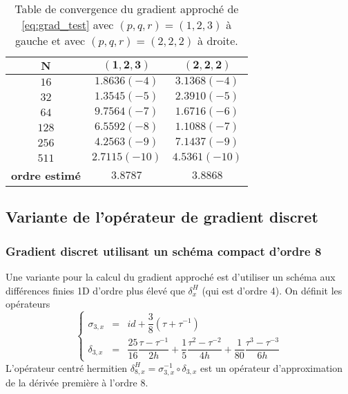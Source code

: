 \begin{table}[htbp]
\begin{center}
\begin{tabular}{|c||c|c|}
\hline
$\mathbf{N}$    & $\mathbf{(1,2,3)}$     & $\mathbf{(2,2,2)}$     \\
\hline
\hline
$16$   & $1.8636 (-4)$ & $3.1368 (-4)$ \\
$32$   & $1.3545 (-5)$ & $2.3910 (-5)$ \\
$64$   & $9.7564 (-7)$ & $1.6716 (-6)$ \\
$128$  & $6.5592 (-8)$ & $1.1088 (-7)$ \\
$256$  & $4.2563 (-9)$ & $7.1437 (-9)$ \\
$511$  & $2.7115(-10)$ & $4.5361(-10)$ \\
\hline
\hline
\textbf{ordre estimé} & $3.8787$ & $3.8868$ \\
\hline 
\end{tabular}
\end{center}
\caption{Table de convergence du gradient approché de \eqref{eq:grad_test} avec $(p,q,r)=(1,2,3)$ à gauche et avec $(p,q,r)=(2,2,2)$ à droite.}
\label{tab:rate_grad}
\end{table}









\subsection{Variante de l'opérateur de gradient discret}


\subsubsection{Gradient discret utilisant un schéma compact d'ordre 8}

Une variante pour la calcul du gradient approché est d'utiliser un schéma aux différences finies 1D d'ordre plus élevé que $\delta_x^H$ (qui est d'ordre 4). On définit les opérateurs 
\begin{equation}
\left\lbrace
\begin{array}{rcl}
\sigma_{3,x} & = & id + \dfrac{3}{8} (\tau + \tau^{-1})\\
\delta_{3,x} & = & \dfrac{25}{16} \dfrac{\tau - \tau^{-1}}{2h} + \dfrac{1}{5} \dfrac{\tau^2 - \tau^{-2}}{4h} + \dfrac{1}{80} \dfrac{\tau^3 - \tau^{-3}}{6h}
\end{array}
\right.
\end{equation}
L'opérateur centré hermitien $\delta_{8,x}^H = \sigma_{3,x}^{-1} \circ \delta_{3,x}$ est un opérateur d'approximation de la dérivée première à l'ordre $8$.

